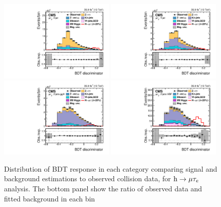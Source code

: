 \begin{figure}[!htpb]\centering
 \includegraphics[width=0.49\textwidth]{plots_and_figures/chapter8/h125/0jetBDT.pdf}
 \includegraphics[width=0.49\textwidth]{plots_and_figures/chapter8/h125/1jetBDT.pdf} \\
 \includegraphics[width=0.49\textwidth]{plots_and_figures/chapter8/h125/2jetggBDT.pdf}
 \includegraphics[width=0.49\textwidth]{plots_and_figures/chapter8/h125/2jetvbBDT.pdf} 
\caption{Distribution of BDT response in each category comparing signal and background estimations to observed collision data, for $\text{h} \to \mu \tau_{e}$ analysis. The bottom panel show the ratio of observed data and fitted background in each bin~\cite{HIG-17-001}}
 \label{fig:BDT_dist_hmue}
\end{figure}

